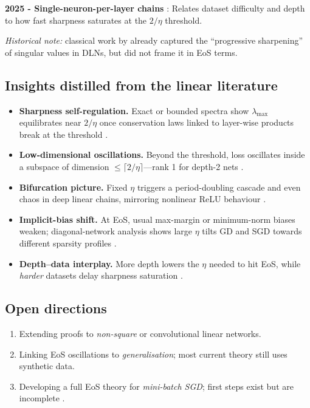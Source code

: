 \documentclass[11pt]{article}
\begin{document}
\textbf{2025 - Single-neuron-per-layer chains} \citep{Yoo2025SingleNeuron}: Relates dataset difficulty and depth to how fast sharpness saturates at the $2/\eta$ threshold.

\vspace{0.5em}
\noindent
\emph{Historical note:} classical work by \citet{Saxe2013Exact} already
captured the ``progressive sharpening'' of singular values in DLNs, but
did not frame it in EoS terms.

\subsection{Insights distilled from the linear literature}

\begin{itemize}
\item \textbf{Sharpness self-regulation.}  Exact or bounded spectra show
      $\lambda_{\max}$ equilibrates near $2/\eta$ once conservation laws
      linked to layer-wise products break at the threshold
      \citep{Ghosh2025DeepMF}.%
\item \textbf{Low-dimensional oscillations.}  Beyond the threshold, loss
      oscillates inside a subspace of dimension
      $\le\lceil2/\eta\rceil$—rank 1 for depth-2 nets
      \citep{Li2022SharpnessEoS}.%
\item \textbf{Bifurcation picture.}  Fixed $\eta$ triggers a
      period-doubling cascade and even chaos in deep linear chains,
      mirroring nonlinear ReLU behaviour
      \citep{Ghosh2025DeepMF,Kalra2023Universal}.%
\item \textbf{Implicit-bias shift.}  At EoS, usual max-margin or
      minimum-norm biases weaken; diagonal-network analysis shows large
      $\eta$ tilts GD and SGD towards different sparsity profiles
      \citep{Labarriere2024DiagonalDLN}.%
\item \textbf{Depth–data interplay.}  More depth lowers the $\eta$
      needed to hit EoS, while \emph{harder} datasets delay sharpness
      saturation \citep{Yoo2025SingleNeuron}.%
\end{itemize}

\subsection{Open directions}

\begin{enumerate}
\item Extending proofs to \emph{non-square} or convolutional linear
      networks. 
\item Linking EoS oscillations to \emph{generalisation}; most current
      theory still uses synthetic data. 
\item Developing a full EoS theory for \emph{mini-batch SGD}; first
      steps exist but are incomplete \citep{Kalra2023Universal}. 
\end{enumerate}
\end{document}
